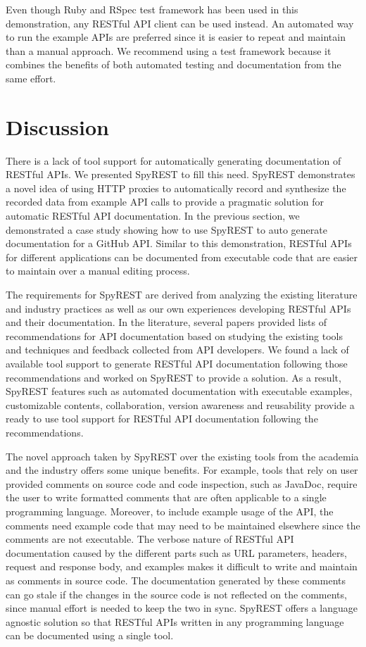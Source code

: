 \documentclass[conference]{IEEEtran}
\begin{document}
Even though Ruby and RSpec test framework has been used in this demonstration, any RESTful API client can be used instead. An automated way to run the example APIs are preferred since it is easier to repeat and maintain than a manual approach. We recommend using a test framework because it combines the benefits of both automated testing and documentation from the same effort.

\section{Discussion}
There is a lack of tool support for automatically generating documentation of RESTful APIs. We presented SpyREST to fill this need. SpyREST demonstrates a novel idea of using HTTP proxies to automatically record and synthesize the recorded data from example API calls to provide a pragmatic solution for automatic RESTful API documentation. In the previous section, we demonstrated a case study showing how to use SpyREST to auto generate documentation for a GitHub API. Similar to this demonstration, RESTful APIs for different applications can be documented from executable code that are easier to maintain over a manual editing process.

The requirements for SpyREST are derived from analyzing the existing literature and industry practices as well as our own experiences developing RESTful APIs and their documentation. In the literature, several papers provided lists of recommendations for API documentation based on studying the existing tools and techniques and feedback collected from API developers. We found a lack of available tool support to generate RESTful API documentation following those recommendations and worked on SpyREST to provide a solution. As a result, SpyREST features such as automated documentation with executable examples, customizable contents, collaboration, version awareness and reusability provide a ready to use tool support for RESTful API documentation following the recommendations.

The novel approach taken by SpyREST over the existing tools from the academia and the industry offers some unique benefits. For example, tools that rely on user provided comments on source code and code inspection, such as JavaDoc, require the user to write formatted comments that are often applicable to a single programming language. Moreover, to include example usage of the API, the comments need example code that may need to be maintained elsewhere since the comments are not executable. The verbose nature of RESTful API documentation caused by the different parts such as URL parameters, headers, request and response body, and examples makes it difficult to write and maintain as comments in source code. The documentation generated by these comments can go stale if the changes in the source code is not reflected on the comments, since manual effort is needed to keep the two in sync. SpyREST offers a language agnostic solution so that RESTful APIs written in any programming language can be documented using a single tool.
\end{document}
